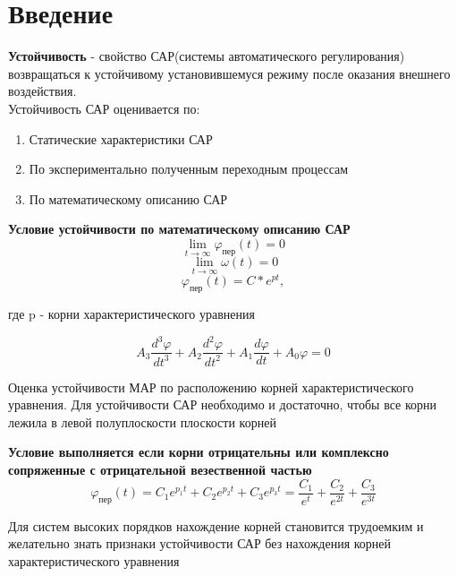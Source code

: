 \documentclass[12pt, a4paper]{report}
\begin{document}
\chapter*{Введение}
\textbf{Устойчивость} - свойство САР(системы автоматического регулирования) возвращаться к устойчивому установившемуся режиму после оказания внешнего воздействия. \\

Устойчивость САР оценивается по:
\begin{enumerate}
  \item Статические характеристики САР
  \item По экспериментально полученным переходным процессам
  \item По математическому описанию САР
\end{enumerate}

\textbf{Условие устойчивости по математическому описанию САР}
\[ \lim\limits_{ t\rightarrow\infty}{\varphi_{пер}(t)} = 0\]
\[ \lim\limits_{ t\rightarrow\infty}{\omega(t)} = 0\]
\[ \varphi_{пер}(t) = C * e^{pt}, \]
\centerline{где p - корни характеристического уравнения}
\begin{displaymath}
A_{3}\frac{d^{3}\varphi}{dt^{3}} + A_{2}\frac{d^{2}\varphi}{dt^{2}} + A_{1}\frac{d\varphi}{dt} + A_{0}\varphi = 0
\end{displaymath}

Оценка устойчивости МАР по расположению корней характеристического уравнения.
Для устойчивости САР необходимо и достаточно, чтобы все корни лежила в левой полуплоскости плоскости корней

\textbf{Условие выполняется если корни отрицательны или комплексно сопряженные с отрицательной везественной частью}
\begin{displaymath}
\varphi_{\text{пер}}(t) = C_{1}e^{p_{1}t} + C_{2}e^{p_{2}t} + C_{3}e^{p_{3}t} =
\frac{C_{1}}{e^{t}} + \frac{C_{2}}{e^{2t}} + \frac{C_{3}}{e^{3t}}
\end{displaymath}

Для систем высоких порядков нахождение корней становится трудоемким и желательно знать признаки устойчивости
САР без нахождения корней характеристического уравнения
\end{document}
